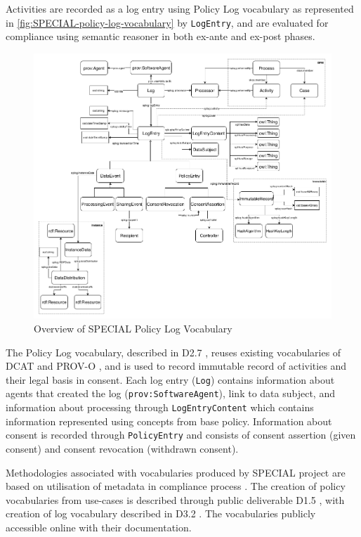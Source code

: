 Activities are recorded as a log entry using Policy Log vocabulary \cite{bonatti_special_2018-1} as represented in \autoref{fig:SPECIAL-policy-log-vocabulary} by \texttt{LogEntry}, and are evaluated for compliance using semantic reasoner in both ex-ante and ex-post phases. 
\begin{figure}[htbp]
    \centering
    \includegraphics[width=0.8\linewidth]{img/SPECIAL_logvocabulary.png}
    \caption{Overview of SPECIAL Policy Log Vocabulary \cite{bonatti_special_2018-1}}
    \label{fig:SPECIAL-policy-log-vocabulary}
\end{figure}

The Policy Log vocabulary, described in D2.7 \cite{kirrane_d2.7_2018}, reuses existing vocabularies of DCAT and PROV-O \cite{lebo_prov-o_2013}, and is used to record immutable record of activities and their legal basis in consent. Each log entry (\texttt{Log}) contains information about agents that created the log (\texttt{prov:SoftwareAgent}), link to data subject, and information about processing through \texttt{LogEntryContent} which contains information represented using concepts from base policy.
Information about consent is recorded through \texttt{PolicyEntry} and consists of consent assertion (given consent) and consent revocation (withdrawn consent).

Methodologies associated with vocabularies produced by SPECIAL project are based on utilisation of metadata in compliance process \cite{wenning_compliance_2018}. The creation of policy vocabularies from use-cases is described through public deliverable D1.5 \cite{bonatti_d1.5_2018}, with creation of log vocabulary described in D3.2 \cite{kirrane_d2.7_2018}. The vocabularies publicly accessible online with their documentation.

